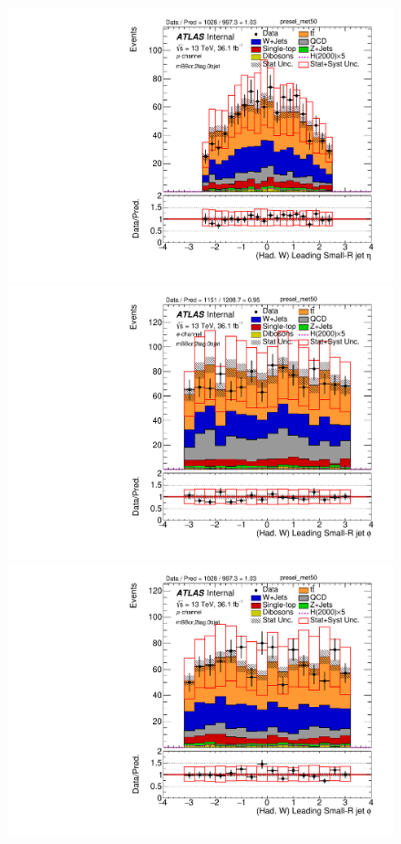 \begin{figure}[!ht]
\begin{center}
\includegraphics[scale=0.33]{./figures/boosted/PlotByChannels/DataMC_2tag_0bjet_mbbcr_muon_presel_met50_LightJet1Eta}                                                                               
\includegraphics[scale=0.33]{./figures/boosted/PlotByChannels/DataMC_2tag_0bjet_mbbcr_elec_presel_met50_LightJet1Phi}                                                                               
\includegraphics[scale=0.33]{./figures/boosted/PlotByChannels/DataMC_2tag_0bjet_mbbcr_muon_presel_met50_LightJet1Phi}                                                                               

\end{center}
\end{figure}

